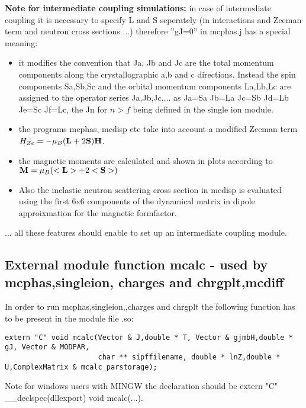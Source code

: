 {\bf Note for intermediate coupling simulations:} in case of intermediate coupling
it is necessary to specify
L and S seperately (in interactions and Zeeman term and neutron cross sections ...)
therefore  ''gJ=0'' in {\prg mcphas.j} has a special meaning:
\begin{itemize}
\item  it modifies
the convention that Ja, Jb and Jc are the total momentum components along the
crystallographic a,b and c directions. Instead
the spin components Sa,Sb,Sc and the orbital momentum components La,Lb,Lc are
assigned to the operator series Ja,Jb,Jc,... as  Ja=Sa Jb=La Jc=Sb Jd=Lb Je=Sc 
Jf=Lc, the Jn for $n>f$ being defined in the single ion module. 
\item the programs {\prg mcphas, mcdisp etc} take into account
 a modified Zeeman term $H_{Ze}=-\mu_B(\mathbf L+2\mathbf S)\mathbf H$.
\item the magnetic moments are calculated and shown in plots according 
to $\mathbf M=\mu_B(<\mathbf L>+2<\mathbf S>)$
\item Also the inelastic neutron scattering cross section in {\prg mcdisp} is evaluated using the %
first
6x6 components of the dynamical matrix  in dipole approixmation for the magnetic formfactor.
\end{itemize}
... all these features should enable to set up an intermediate coupling module.


\subsection{External module function {\prg mcalc} - used by {\prg mcphas},{\prg singleion},{\prg %
charges} and {\prg chrgplt},{\prg mcdiff} }

In order to run {\prg mcphas},{\prg singleion},,{\prg charges} and {\prg %
chrgplt} the following function has to be 
present in the module file {\prg *.so}:

\begin{verbatim}
extern "C" void mcalc(Vector & J,double * T, Vector & gjmbH,double * gJ, Vector & MODPAR,
                      char ** sipffilename, double * lnZ,double * U,ComplexMatrix & mcalc_parstorage);
\end{verbatim}

Note for windows users with MINGW the declaration should be {\prg extern "C" \_\_declspec(dllexport) void %
mcalc(...)}.

